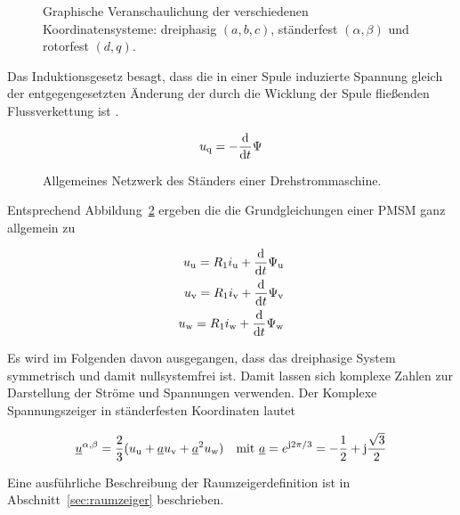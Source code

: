 \begin{figure}[!htb]
\centering
\label{fig:synchron-dq}
\caption{Graphische Veranschaulichung der verschiedenen Koordinatensysteme: dreiphasig $(a,
b, c)$, ständerfest $(\alpha, \beta)$ und rotorfest $(d, q)$.}
\end{figure}

Das Induktionsgesetz besagt, dass die in einer Spule induzierte Spannung gleich der entgegengesetzten Änderung der durch die Wicklung der Spule fließenden Flussverkettung ist \autocite{kellner2012}.

\begin{align}
u_{\mathrm{q}} = - \frac{\mathrm{d}}{\mathrm{d}t}\Psi
\end{align}

\begin{figure}[!htb]
\centering
\label{fig:netzwerk-stander-drehstrom}
\caption{Allgemeines Netzwerk des Ständers einer Drehstrommaschine.}
\end{figure}

Entsprechend Abbildung~\ref{fig:netzwerk-stander-drehstrom} ergeben die die Grundgleichungen einer PMSM ganz allgemein zu

\begin{align}
u_{\mathrm{u}} = R_{\mathrm{1}}i_{\mathrm{u}} + \frac{\mathrm{d}}{\mathrm{d}t}\Psi_{\mathrm{u}} \\ \label{eqn:10}
u_{\mathrm{v}} = R_{\mathrm{1}}i_{\mathrm{v}} + \frac{\mathrm{d}}{\mathrm{d}t}\Psi_{\mathrm{v}} \\ \nonumber
u_{\mathrm{w}} = R_{\mathrm{1}}i_{\mathrm{w}} + \frac{\mathrm{d}}{\mathrm{d}t}\Psi_{\mathrm{w}} \nonumber
\end{align}

Es wird im Folgenden davon ausgegangen, dass das dreiphasige System symmetrisch und damit nullsystemfrei ist.
Damit lassen sich komplexe Zahlen zur Darstellung der Ströme und Spannungen verwenden.
Der Komplexe Spannungszeiger in ständerfesten Koordinaten lautet

\begin{align}
\underline{u}^{\alpha, \beta} = \frac{2}{3}(u_{\mathrm{u}} + \underline{a} u_{\mathrm{v}} + \underline{a}^2 u_{\mathrm{w}} ) \quad \text{mit}\,\, \underline{a} = e^{\mathrm{j}2\pi/3} = -\frac{1}{2}+\mathrm{j}\frac{\sqrt{3}}{2} \label{eqn:2}
\end{align}

Eine ausführliche Beschreibung der Raumzeigerdefinition ist in Abschnitt~\ref{sec:raumzeiger} beschrieben.

